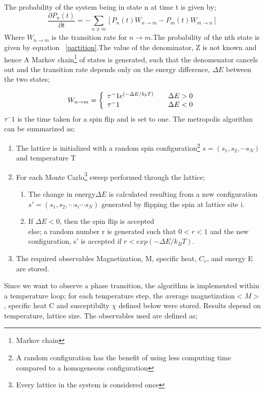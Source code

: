 \documentclass[12pt]{article}
\begin{document}
The probability of the system being in state n at time t is given by;
$$ \frac{\partial P_n(t)}{\partial t} = -\sum_{n \neq m}\left[ P_n(t)W_{n\to m} - P_m(t)W_{m\to n} \right]$$
Where $W_{n\to m} $ is the transition rate for $n\to m$.The probability of the nth state is given by equation ~\ref{partition}.The value of the denominator, Z is not known and hence A Markov chain\footnote{Markov chain} of states is generated, such that the denomenator cancels out and the transition rate depends only on the energy difference, $\Delta E$ between the two states;

\[ W_{n \to m} = \left\{ 
  \begin{array}{l l}
    \tau^-1 e^{(-\Delta E/k_bT)} & \quad \Delta E >0\\
    \tau^-1 & \quad \Delta E<0
  \end{array} \right.\]
$\tau^-1$ is the time taken for a spin flip and is set to one.
The metropolis algorithm can be summarized as;
\begin{enumerate}
\item{ The lattice is initialized with a random spin configuration\footnote{A random configuration has the benefit of using less computing time compared to a homogeneous configuration} $s= (s_1, s_2, \cdots s_N)$ and temperature T}
\item{For each Monte Carlo\footnote{Every lattice in the system is considered once} sweep performed through the lattice; }
\begin{enumerate}
\item{The change in energy$\Delta E$ is calculated resulting from a new configuration $s' =(s_1, s_2, \cdots s_i \cdots s_N)$ generated by flipping the spin at lattice site i.}
\item{If $\Delta E <0$, then the spin flip is accepted\\
else; a random number r is generated such that $0<r<1$ and  the new configuration, s' is accepted if $r<exp(-\Delta E/k_B T)$.}
\end{enumerate}
\item{The required observables Magnetization, M, specific heat, $C_v$, and energy E are stored.}
\end{enumerate}
Since we want to observe a phase transition, the algorithm is implemented within a temperature loop; for each temperature step, the average magnetization$<M>$, specific heat C and susceptibilty $\chi$ defined below were stored.
Results depend on temperature, lattice size. The observables used are defined as;
\end{document}

